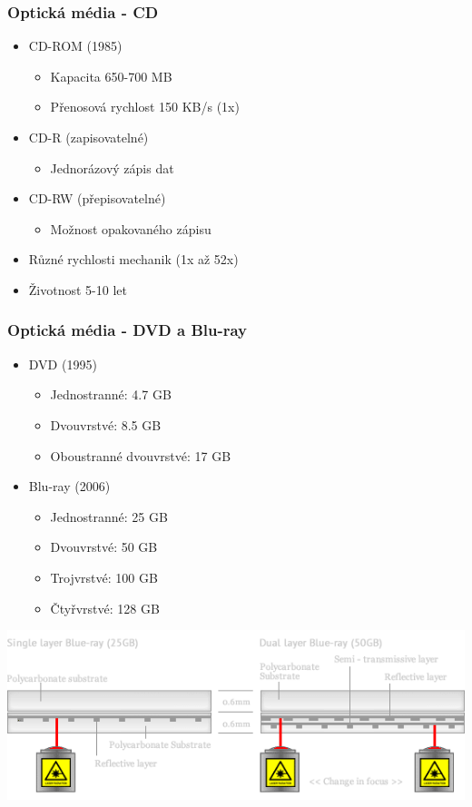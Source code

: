 \documentclass[aspectratio=43]{beamer}
\begin{document}
\begin{frame}
\frametitle{Optická média - CD}
\begin{itemize}
\item CD-ROM (1985)
  \begin{itemize}
  \item Kapacita 650-700 MB
  \item Přenosová rychlost 150 KB/s (1x)
  \end{itemize}
\item CD-R (zapisovatelné)
  \begin{itemize}
  \item Jednorázový zápis dat 
  \end{itemize}
\item CD-RW (přepisovatelné)
  \begin{itemize}
  \item Možnost opakovaného zápisu
  \end{itemize}
\item Různé rychlosti mechanik (1x až 52x)
\item Životnost 5-10 let
\end{itemize}
\end{frame}

\begin{frame}
\frametitle{Optická média - DVD a Blu-ray}
\begin{itemize}
\item DVD (1995)
  \begin{itemize}
  \item Jednostranné: 4.7 GB
  \item Dvouvrstvé: 8.5 GB
  \item Oboustranné dvouvrstvé: 17 GB
  \end{itemize}
\item Blu-ray (2006)
  \begin{itemize}
  \item Jednostranné: 25 GB
  \item Dvouvrstvé: 50 GB
  \item Trojvrstvé: 100 GB
  \item Čtyřvrstvé: 128 GB
  \end{itemize}
\end{itemize}
\begin{center}
        \includegraphics[width=0.85\linewidth]{extrahovane_obrazky/bluray.png}
    \end{center}
\end{frame}
\end{document}

